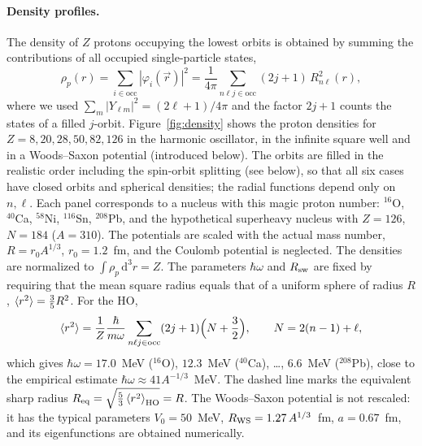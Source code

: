 \documentclass[11pt,a4paper]{article}
\newcommand{\ud}{\mathrm{d}}
\begin{document}
\paragraph{Density profiles.} The density of $Z$ protons occupying the lowest orbits is obtained by summing the contributions of all occupied single-particle states,
\[
\rho_p(r)=\sum_{i\in\text{occ}}|\varphi_i(\vec r)|^2=\frac{1}{4\pi}\sum_{n\ell j\in\text{occ}}(2j+1)\,R_{n\ell}^2(r),
\]
where we used $\sum_m|Y_{\ell m}|^2=(2\ell+1)/4\pi$ and the factor $2j+1$ counts the states of a filled $j$-orbit. Figure~\ref{fig:density} shows the proton densities for $Z=8,20,28,50,82,126$ in the harmonic oscillator, in the infinite square well and in a Woods--Saxon potential (introduced below). The orbits are filled in the realistic order including the spin-orbit splitting (see below), so that all six cases have closed orbits and spherical densities; the radial functions depend only on $n,\ell$. Each panel corresponds to a nucleus with this magic proton number: $^{16}$O, $^{40}$Ca, $^{58}$Ni, $^{116}$Sn, $^{208}$Pb, and the hypothetical superheavy nucleus with $Z=126$, $N=184$ ($A=310$). The potentials are scaled with the actual mass number, $R=r_0A^{1/3}$, $r_0=1.2$~fm, and the Coulomb potential is neglected. The densities are normalized to $\int\rho_p\,\ud^3r=Z$. The parameters $\hbar\omega$ and $R_{\rm sw}$ are fixed by requiring that the mean square radius equals that of a uniform sphere of radius $R$, $\braket{r^2}=\frac35R^2$. For the HO,
\[
\braket{r^2}=\frac{1}{Z}\frac{\hbar}{m\omega}\sum_{n\ell j\in\text{occ}}(2j+1)\Big(N+\frac32\Big),
\qquad N=2(n-1)+\ell,
\]
which gives $\hbar\omega=17.0$~MeV ($^{16}$O), $12.3$~MeV ($^{40}$Ca), \dots, $6.6$~MeV ($^{208}$Pb), close to the empirical estimate $\hbar\omega\approx41A^{-1/3}$~MeV. The dashed line marks the equivalent sharp radius $R_{\rm eq}=\sqrt{\frac53\braket{r^2}_{\rm HO}}=R$. The Woods--Saxon potential is not rescaled: it has the typical parameters $V_0=50$~MeV, $R_{\rm WS}=1.27\,A^{1/3}$~fm, $a=0.67$~fm, and its eigenfunctions are obtained numerically.
\end{document}
